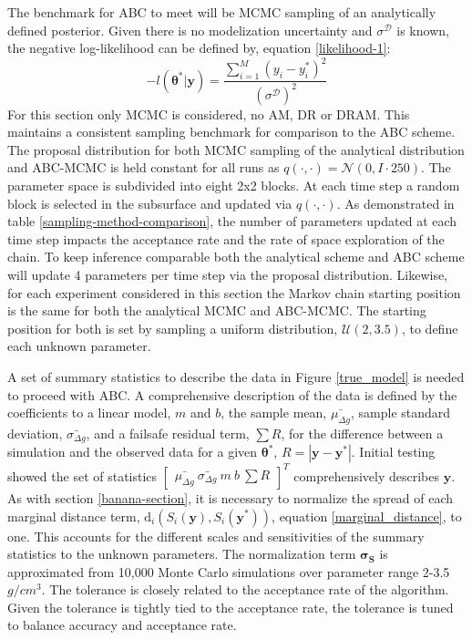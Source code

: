 The benchmark for ABC to meet will be MCMC sampling of an analytically defined posterior. Given there is no modelization uncertainty and $\sigma^{\mathcal{D}}$ is known, the negative log-likelihood can be defined by, equation \ref{likelihood-1}:
\begin{equation}
	-l(\bm{\theta^*}|\bm{y}) = \frac{\sum_{i = 1}^{M}(y_i-y^*_i)^2}{(\sigma^{\mathcal{D}})^2}
	\label{analytical-applied-likelihood}
\end{equation}
For this section only MCMC is considered, no AM, DR or DRAM. This maintains a consistent sampling benchmark for comparison to the ABC scheme. The proposal distribution for both MCMC sampling of the analytical distribution and ABC-MCMC is held constant for all runs as $q(\cdot,\cdot) = \mathcal{N}(0,I\cdot250)$. The parameter space is subdivided into eight 2x2 blocks. At each time step a random block is selected in the subsurface and updated via $q(\cdot,\cdot)$. As demonstrated in table \ref{sampling-method-comparison}, the number of parameters updated at each time step impacts the acceptance rate and the rate of space exploration of the chain. To keep inference comparable both the analytical scheme and ABC scheme will update 4 parameters per time step via the proposal distribution. Likewise, for each experiment considered in this section the Markov chain starting position is the same for both the analytical MCMC and ABC-MCMC. The starting position for both is set by sampling a uniform distribution, $\mathcal{U}(2,3.5)$, to define each unknown parameter. \par

A set of summary statistics to describe the data in Figure \ref{true_model} is needed to proceed with ABC. A comprehensive description of the data is defined by the coefficients to a linear model, $m$ and $b$, the sample mean, $\bar{\mu_{\Delta g}}$, sample standard deviation, $\bar{\sigma_{\Delta g}}$, and a failsafe residual term, $\sum R$, for the difference between a simulation and the observed data for a given $\bm{\theta^*}$, $R = |\bm{y}-\bm{y^*}|$. Initial testing showed the set of statistics $\begin{bmatrix}
\bar{\mu_{\Delta g}}\ \bar{\sigma_{\Delta g}}\ m\ b\ \sum R
\end{bmatrix}^T$ comprehensively describes $\bm{y}$. As with section \ref{banana-section}, it is necessary to normalize the spread of each marginal distance term, $\text{d}_i(S_i(\bm{y}),S_i(\bm{y^*}))$, equation \ref{marginal_distance}, to one. This accounts for the different scales and sensitivities of the summary statistics to the unknown parameters. The normalization term $\bm{\sigma_S}$ is approximated from 10,000 Monte Carlo simulations over parameter range 2-3.5 $g/cm^3$. The tolerance is closely related to the acceptance rate of the algorithm. Given the tolerance is tightly tied to the acceptance rate, the tolerance is tuned to balance accuracy and acceptance rate.\par

